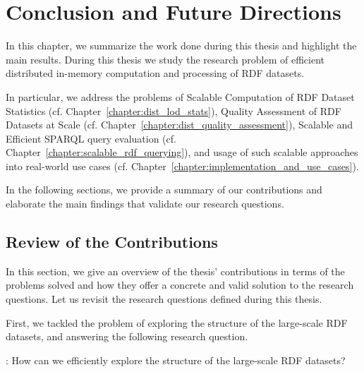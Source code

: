 \chapter{Conclusion and Future Directions}
\label{chapter:conclusion}

In this chapter, we summarize the work done during this thesis and highlight the main results.
During this thesis we study the research problem of efficient distributed in-memory computation and processing of RDF datasets.

In particular, we address the problems of Scalable Computation of RDF Dataset Statistics (cf. Chapter~\ref{chapter:dist_lod_stats}), Quality Assessment of RDF Datasets at Scale (cf. Chapter~\ref{chapter:dist_quality_assessment}), Scalable and Efficient SPARQL query evaluation (cf. Chapter~\ref{chapter:scalable_rdf_querying}), and usage of such scalable approaches into real-world use cases (cf. Chapter~\ref{chapter:implementation_and_use_cases}).

In the following sections, we provide a summary of our contributions and elaborate the main findings that validate our research questions.

\section{Review of the Contributions}
In this section, we give an overview of the thesis' contributions in terms of the problems solved and how they offer a concrete and valid solution to the research questions.
Let us revisit the research questions defined during this thesis.

First, we tackled the problem of exploring the structure of the large-scale RDF datasets, and answering the following research question.

\begin{tcolorbox}
\textbf{\rqNr[RQ1]\label{rqc:1}}: How can we efficiently explore the structure of the large-scale RDF datasets?
\end{tcolorbox}

